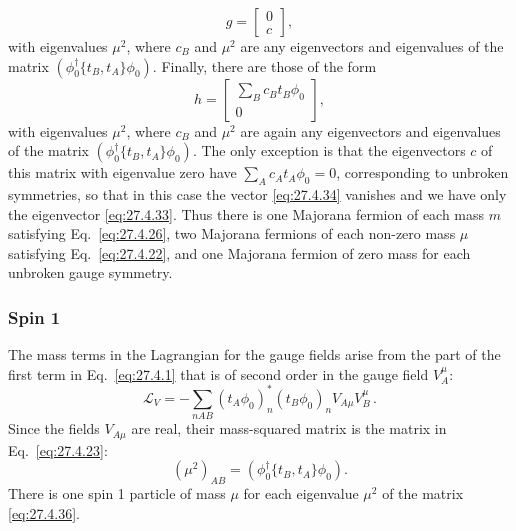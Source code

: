 \begin{equation}
  g=
  \begin{bmatrix}
    0\\
    c
  \end{bmatrix},
  \tag{27.4.33}\label{eq:27.4.33}
\end{equation}
with eigenvalues \(\mu^2\), where \(c_B\) and \(\mu^2\) are any eigenvectors
and eigenvalues of the matrix
\(\left(\phi_0^\dagger\{t_B,t_A\}\phi_0\right)\). Finally, there are those
of the form
\begin{equation}
  h=
  \begin{bmatrix}
    \sum_Bc_Bt_B\phi_0\\
    0
  \end{bmatrix},
  \tag{27.4.34}\label{eq:27.4.34}
\end{equation}
with eigenvalues \(\mu^2\), where \(c_B\) and \(\mu^2\) are again any
eigenvectors and eigenvalues of the matrix
\(\left(\phi_0^\dagger\{t_B,t_A\}\phi_0\right)\). The only exception is
that the eigenvectors \(c\) of this matrix with eigenvalue zero have
\(\sum_Ac_At_A\phi_0=0\), corresponding to unbroken symmetries, so that in
this case the vector \eqref{eq:27.4.34} vanishes and we have only the
eigenvector \eqref{eq:27.4.33}. Thus there is one Majorana fermion of each
mass \(m\) satisfying Eq.~\eqref{eq:27.4.26}, two Majorana fermions of each
non-zero mass \(\mu\) satisfying Eq.~\eqref{eq:27.4.22}, and one Majorana
fermion of zero mass for each unbroken gauge symmetry.

\subsubsection*{Spin 1}

The mass terms in the Lagrangian for the gauge fields arise from the part of
the first term in Eq.~\eqref{eq:27.4.1} that is of second order in the gauge
field \(V_A^\mu\):
\begin{equation}
  \mathcal{L}_V
  =-\sum_{nAB}(t_A\phi_0)_n^*(t_B\phi_0)_nV_{A\mu}V_B^\mu\,.
  \tag{27.4.35}\label{eq:27.4.35}
\end{equation}
Since the fields \(V_{A\mu}\) are real, their mass-squared matrix is the
matrix in Eq.~\eqref{eq:27.4.23}:
\begin{equation}
  (\mu^2)_{AB}
  =\left(\phi_0^\dagger\{t_B,t_A\}\phi_0\right).
  \tag{27.4.36}\label{eq:27.4.36}
\end{equation}
There is one spin 1 particle of mass \(\mu\) for each eigenvalue \(\mu^2\) of
the matrix \eqref{eq:27.4.36}.

